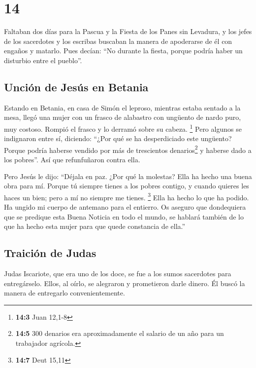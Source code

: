 \hypertarget{section-13}{%
\section{14}\label{section-13}}

 Faltaban dos días para la Pascua y la Fiesta de los Panes
sin Levadura, y los jefes de los sacerdotes y los escribas buscaban la
manera de apoderarse de él con engaños y matarlo.  Pues
decían: ``No durante la fiesta, porque podría haber un disturbio entre
el pueblo''.

\hypertarget{unciuxf3n-de-jesuxfas-en-betania}{%
\subsection{Unción de Jesús en
Betania}\label{unciuxf3n-de-jesuxfas-en-betania}}

 Estando en Betania, en casa de Simón el leproso, mientras
estaba sentado a la mesa, llegó una mujer con un frasco de alabastro con
ungüento de nardo puro, muy costoso. Rompió el frasco y lo derramó sobre
su cabeza. \footnote{\textbf{14:3} Juan 12,1-8}  Pero
algunos se indignaron entre sí, diciendo: ``¿Por qué se ha desperdiciado
este ungüento?  Porque podría haberse vendido por más de
trescientos denarios\footnote{\textbf{14:5} 300 denarios era
  aproximadamente el salario de un año para un trabajador agrícola.} y
haberse dado a los pobres''. Así que refunfuñaron contra ella.

 Pero Jesús le dijo: ``Déjala en paz. ¿Por qué la
molestas? Ella ha hecho una buena obra para mí.  Porque tú
siempre tienes a los pobres contigo, y cuando quieres les haces un bien;
pero a mí no siempre me tienes. \footnote{\textbf{14:7} Deut 15,11}
 Ella ha hecho lo que ha podido. Ha ungido mi cuerpo de
antemano para el entierro.  Os aseguro que dondequiera que
se predique esta Buena Noticia en todo el mundo, se hablará también de
lo que ha hecho esta mujer para que quede constancia de ella.''

\hypertarget{traiciuxf3n-de-judas}{%
\subsection{Traición de Judas}\label{traiciuxf3n-de-judas}}

 Judas Iscariote, que era uno de los doce, se fue a los
sumos sacerdotes para entregárselo.  Ellos, al oírlo, se
alegraron y prometieron darle dinero. Él buscó la manera de entregarlo
convenientemente.

